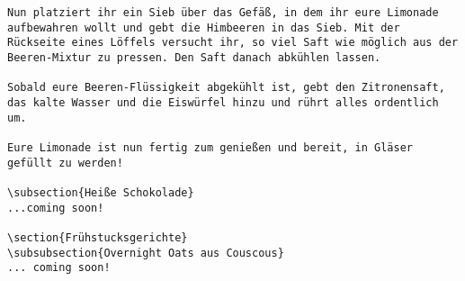 \begin{verbatim}
Nun platziert ihr ein Sieb über das Gefäß, in dem ihr eure Limonade aufbewahren wollt und gebt die Himbeeren in das Sieb. Mit der Rückseite eines Löffels versucht ihr, so viel Saft wie möglich aus der Beeren-Mixtur zu pressen. Den Saft danach abkühlen lassen.
	
Sobald eure Beeren-Flüssigkeit abgekühlt ist, gebt den Zitronensaft, das kalte Wasser und die Eiswürfel hinzu und rührt alles ordentlich um.
	
Eure Limonade ist nun fertig zum genießen und bereit, in Gläser gefüllt zu werden!
	
\subsection{Heiße Schokolade}
...coming soon!
	
\section{Frühstucksgerichte}
\subsubsection{Overnight Oats aus Couscous}
... coming soon!
	

\end{verbatim}